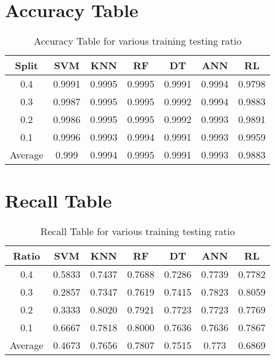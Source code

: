 \documentclass[12pt,a4paper]{report}
\begin{document}
\section{Accuracy Table}
\begin{table}[!h]
\centering
\begin{tabular}{|c|c|c|c|c|c|c|}
  \hline
  Split & SVM & KNN & RF & DT & ANN & RL \\
  \hline
  0.4 & 0.9991 & 0.9995 & 0.9995 & 0.9991 & 0.9994 & 0.9798 \\
  \hline
  0.3 & 0.9987 & 0.9995 & 0.9995 & 0.9992 & 0.9994 & 0.9883 \\
  \hline
  0.2 & 0.9986 & 0.9995 & 0.9995 & 0.9992 & 0.9993 & 0.9891 \\
  \hline
  0.1 & 0.9996 & 0.9993 & 0.9994 & 0.9991 & 0.9993 & 0.9959 \\
  \hline
  Average & 0.999 & 0.9994 & 0.9995 & 0.9991 & 0.9993 & 0.9883 \\
  \hline
\end{tabular}
\caption{Accuracy Table for various training testing ratio}
\label{tab:results}
\end{table}

\clearpage

\section{Recall Table}
\begin{table}[h!]
\centering
\begin{tabular}{|c|c|c|c|c|c|c|}
  \hline
  Ratio & SVM & KNN & RF & DT & ANN & RL \\
  \hline
  0.4 & 0.5833 & 0.7437 & 0.7688 & 0.7286 & 0.7739 & 0.7782 \\
  \hline
  0.3 & 0.2857 & 0.7347 & 0.7619 & 0.7415 & 0.7823 & 0.8059 \\
  \hline
  0.2 & 0.3333 & 0.8020 & 0.7921 & 0.7723 & 0.7723 & 0.7769 \\
  \hline
  0.1 & 0.6667 & 0.7818 & 0.8000 & 0.7636 & 0.7636 & 0.7867 \\
  \hline
  Average & 0.4673 & 0.7656 & 0.7807 & 0.7515 & 0.773  & 0.6869 \\
  \hline
\end{tabular}
\caption{Recall Table for various training testing ratio}
\label{tab:results}
\end{table}
\end{document}
